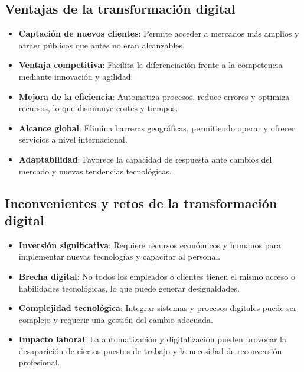 \documentclass[11pt,a4paper]{article}
\begin{document}
		\subsection{Ventajas de la transformación digital}

		\begin{ChecklistBox}
		\begin{itemize}
			\item \textbf{Captación de nuevos clientes}: Permite acceder a mercados más amplios y atraer públicos que antes no eran alcanzables.
			\item \textbf{Ventaja competitiva}: Facilita la diferenciación frente a la competencia mediante innovación y agilidad.
			\item \textbf{Mejora de la eficiencia}: Automatiza procesos, reduce errores y optimiza recursos, lo que disminuye costes y tiempos.
			\item \textbf{Alcance global}: Elimina barreras geográficas, permitiendo operar y ofrecer servicios a nivel internacional.
			\item \textbf{Adaptabilidad}: Favorece la capacidad de respuesta ante cambios del mercado y nuevas tendencias tecnológicas.
		\end{itemize}
		\end{ChecklistBox}

		\subsection{Inconvenientes y retos de la transformación digital}

		\begin{ChecklistBox}
		\begin{itemize}
			\item \textbf{Inversión significativa}: Requiere recursos económicos y humanos para implementar nuevas tecnologías y capacitar al personal.
			\item \textbf{Brecha digital}: No todos los empleados o clientes tienen el mismo acceso o habilidades tecnológicas, lo que puede generar desigualdades.
			\item \textbf{Complejidad tecnológica}: Integrar sistemas y procesos digitales puede ser complejo y requerir una gestión del cambio adecuada.
			\item \textbf{Impacto laboral}: La automatización y digitalización pueden provocar la desaparición de ciertos puestos de trabajo y la necesidad de reconversión profesional.
		\end{itemize}
		\end{ChecklistBox}
\end{document}
